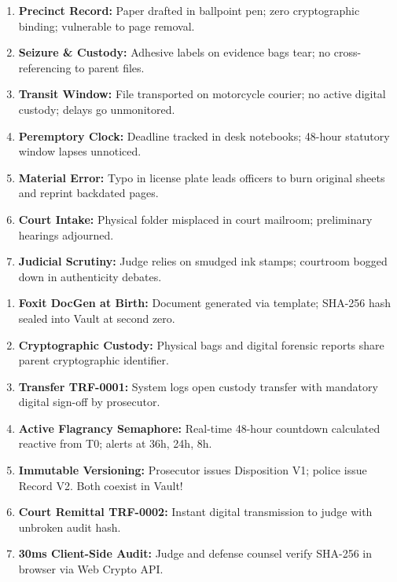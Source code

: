 \documentclass[11pt,a4paper]{article}
\begin{document}
\begin{alertbox}
\begin{enumerate}[leftmargin=1.5em,itemsep=3pt]
    \item \textbf{Precinct Record:} Paper drafted in ballpoint pen; zero cryptographic binding; vulnerable to page removal.
    \item \textbf{Seizure \& Custody:} Adhesive labels on evidence bags tear; no cross-referencing to parent files.
    \item \textbf{Transit Window:} File transported on motorcycle courier; no active digital custody; delays go unmonitored.
    \item \textbf{Peremptory Clock:} Deadline tracked in desk notebooks; 48-hour statutory window lapses unnoticed.
    \item \textbf{Material Error:} Typo in license plate leads officers to burn original sheets and reprint backdated pages.
    \item \textbf{Court Intake:} Physical folder misplaced in court mailroom; preliminary hearings adjourned.
    \item \textbf{Judicial Scrutiny:} Judge relies on smudged ink stamps; courtroom bogged down in authenticity debates.
\end{enumerate}
\end{alertbox}

\vspace{4pt}

\begin{successbox}
\begin{enumerate}[leftmargin=1.5em,itemsep=3pt]
    \item \textbf{Foxit DocGen at Birth:} Document generated via template; SHA-256 hash sealed into Vault at second zero.
    \item \textbf{Cryptographic Custody:} Physical bags and digital forensic reports share parent cryptographic identifier.
    \item \textbf{Transfer TRF-0001:} System logs open custody transfer with mandatory digital sign-off by prosecutor.
    \item \textbf{Active Flagrancy Semaphore:} Real-time 48-hour countdown calculated reactive from T0; alerts at 36h, 24h, 8h.
    \item \textbf{Immutable Versioning:} Prosecutor issues Disposition V1; police issue Record V2. Both coexist in Vault!
    \item \textbf{Court Remittal TRF-0002:} Instant digital transmission to judge with unbroken audit hash.
    \item \textbf{30ms Client-Side Audit:} Judge and defense counsel verify SHA-256 in browser via Web Crypto API.
\end{enumerate}
\end{successbox}
\end{document}
